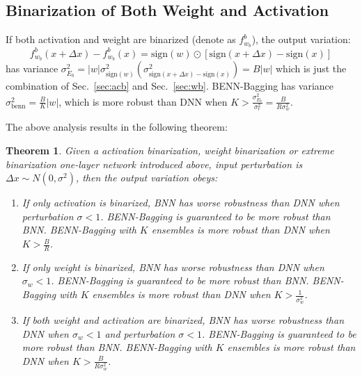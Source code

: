 \documentclass[10pt,twocolumn,letterpaper]{article}
\newtheorem{theorem}{Theorem}
\begin{document}
\subsection{Binarization of Both Weight and Activation}
If both activation and weight are binarized (denote as $f_{w_{b}}^{b}$), the output variation:
\[
    f_{w_{b}}^{b}(x+\Delta x) - f_{w_{b}}^{b}(x) = \text{sign}(w) \odot [\text{sign}(x+\Delta x) - \text{sign}(x)]
\]
has variance $\sigma_{E_{b}}^{2} = |w|\sigma_{\text{sign}(w)}^{2}(\sigma_{\text{sign}(x+\Delta x)-\text{sign}(x)}^{2}) = B|w|$ which is just the combination of Sec.~\ref{sec:acb} and Sec.~\ref{sec:wb}. BENN-Bagging has variance $\sigma_{\text{benn}}^{2} = \frac{B}{K}|w|$, which is more robust than DNN when $K > \frac{\sigma_{E_{b}}^{2}}{\sigma_{r}^{2}} = \frac{B}{R\sigma_{w}^{2}}$.

The above analysis results in the following theorem:

\begin{theorem}
    \label{lm1}
    Given a activation binarization, weight binarization or extreme binarization one-layer network introduced above, input perturbation is $\Delta x \sim N(0,\sigma^{2})$, then the output variation obeys:
    \begin{enumerate}
        \item If only activation is binarized, BNN has worse robustness than DNN when perturbation $\sigma < 1$. BENN-Bagging is guaranteed to be more robust than BNN. BENN-Bagging with $K$ ensembles is more robust than DNN when $K > \frac{B}{R}$.
        \item If only weight is binarized, BNN has worse robustness than DNN when $\sigma_{w} < 1$. BENN-Bagging is guaranteed to be more robust than BNN. BENN-Bagging with $K$ ensembles is more robust than DNN when $K > \frac{1}{\sigma_{w}^{2}}$.
        \item If both weight and activation are binarized, BNN has worse robustness than DNN when $\sigma_{w} < 1$ and perturbation $\sigma < 1$. BENN-Bagging is guaranteed to be more robust than BNN. BENN-Bagging with $K$ ensembles is more robust than DNN when $K > \frac{B}{R\sigma_{w}^{2}}$.
    \end{enumerate}

\end{theorem}
\end{document}
